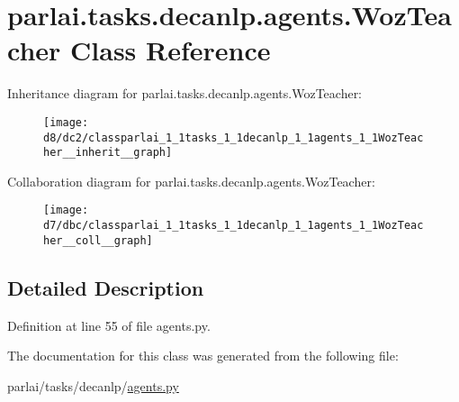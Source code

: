 \hypertarget{classparlai_1_1tasks_1_1decanlp_1_1agents_1_1WozTeacher}{}\section{parlai.\+tasks.\+decanlp.\+agents.\+Woz\+Teacher Class Reference}
\label{classparlai_1_1tasks_1_1decanlp_1_1agents_1_1WozTeacher}


Inheritance diagram for parlai.\+tasks.\+decanlp.\+agents.\+Woz\+Teacher\+:\nopagebreak
\begin{figure}[H]
\begin{center}
\leavevmode
\texttt{[image: d8/dc2/classparlai\_1\_1tasks\_1\_1decanlp\_1\_1agents\_1\_1WozTeacher\_\_inherit\_\_graph]}
\end{center}
\end{figure}


Collaboration diagram for parlai.\+tasks.\+decanlp.\+agents.\+Woz\+Teacher\+:\nopagebreak
\begin{figure}[H]
\begin{center}
\leavevmode
\texttt{[image: d7/dbc/classparlai\_1\_1tasks\_1\_1decanlp\_1\_1agents\_1\_1WozTeacher\_\_coll\_\_graph]}
\end{center}
\end{figure}


\subsection{Detailed Description}


Definition at line 55 of file agents.\+py.



The documentation for this class was generated from the following file\+:\begin{DoxyCompactItemize}
\item 
parlai/tasks/decanlp/\hyperlink{parlai_2tasks_2decanlp_2agents_8py}{agents.\+py}\end{DoxyCompactItemize}
